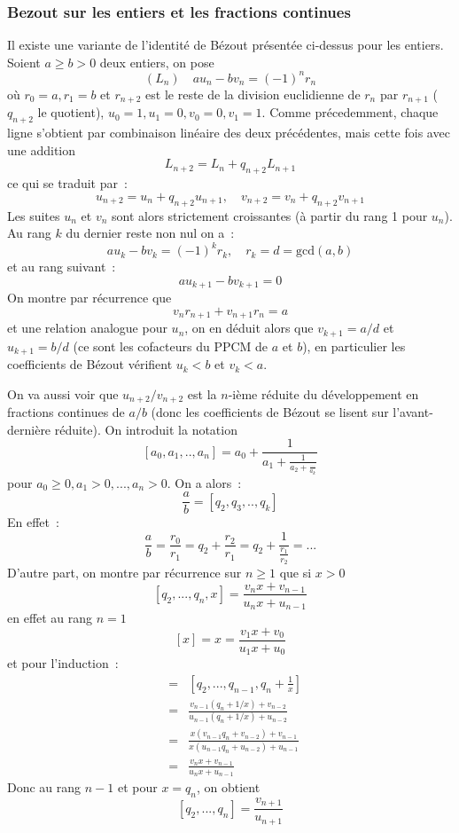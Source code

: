 \documentclass[a4paper,11pt]{article}
\begin{document}
\subsubsection{Bezout sur les entiers et les fractions continues}
Il existe une variante de l'identit\'e de B\'ezout pr\'esent\'ee
ci-dessus pour les entiers. Soient $a\geq b>0$ deux entiers, on pose
$$ (L_n) \quad a u_n - b v_n = (-1)^n r_n $$ 
o\`u $r_0=a, r_1=b$ et $r_{n+2}$ est le reste de la division
euclidienne de $r_n$ par $r_{n+1}$ ($q_{n+2}$ le quotient), $u_0=1, u_1=0, v_0=0,v_1=1$.
Comme pr\'ecedemment, chaque ligne s'obtient par combinaison
lin\'eaire des deux pr\'ec\'edentes, mais cette fois avec une addition
$$ L_{n+2}=L_n+q_{n+2} L_{n+1}$$ 
ce qui se traduit par~:
$$ u_{n+2}=u_n+q_{n+2} u_{n+1}, \quad v_{n+2}=v_n+q_{n+2} v_{n+1}$$
Les suites $u_n$ et $v_n$ sont alors strictement croissantes (\`a
partir du rang 1 pour $u_n$). Au rang $k$ du dernier reste non nul on
a~:
$$ a u_k - b v_k = (-1)^k r_k, \quad r_k=d=\mbox{gcd}(a,b)$$
et au rang suivant~:
$$ au_{k+1} -b v_{k+1}=0$$
On montre par r\'ecurrence que
$$ v_n r_{n+1} + v_{n+1} r_n=a$$
et une relation analogue pour $u_n$, on en d\'eduit alors que
$v_{k+1}=a/d$ et $u_{k+1}=b/d$ (ce sont les cofacteurs du PPCM de $a$
et $b$), 
en particulier les coefficients de
B\'ezout v\'erifient $u_k<b$ et $v_k<a$.

On va aussi voir que $u_{n+2}/v_{n+2}$ est la $n$-i\`eme r\'eduite du
d\'eveloppement
en fractions continues de $a/b$ (donc les coefficients de B\'ezout
se lisent sur l'avant-derni\`ere r\'eduite). On introduit la notation
$$[a_0,a_1,..,a_n] =a_0+\frac{1}{a_1+\frac{1}{a_2+\frac{...}{a_k}}}$$
pour $a_0 \geq 0, a_1>0, ..., a_n>0$.
On a alors~:
$$ \frac{a}{b}=[q_2,q_3,..,q_k]$$
En effet~:
$$ \frac{a}{b}= \frac{r_0}{r_1}=q_2 +\frac{r_2}{r_1} = q_2 +
\frac{1}{\frac{r_1}{r_2}} = ...$$
D'autre part, on montre par r\'ecurrence sur $n\geq 1$ que si $x>0$
$$ [q_2,..., q_n,x]=\frac{v_{n}x+v_{n-1}}{u_{n}x+u_{n-1}}$$
en effet au rang $n=1$
$$ [x]=x=\frac{v_1 x + v_0}{u_1 x+u_0 }$$
et pour l'induction~:
\begin{eqnarray*}
  [q_2,..., q_n,x] &= & [q_2,..., q_{n-1},q_n+\frac{1}{x}] \\
&=& \frac{v_{n-1}(q_n+1/x)+v_{n-2}}{u_{n-1}(q_n+1/x)+u_{n-2}} \\
&=&
\frac{x(v_{n-1}q_n+v_{n-2})+v_{n-1}}{x(u_{n-1}q_n+u_{n-2})+u_{n-1}} \\
& = & 
\frac{v_{n}x+v_{n-1}}{u_{n}x+u_{n-1}}
\end{eqnarray*}
Donc au rang $n-1$ et pour $x=q_{n}$, on obtient 
$$ [q_2,..., q_n]=\frac{v_{n+1}}{u_{n+1}}$$
\end{document}
